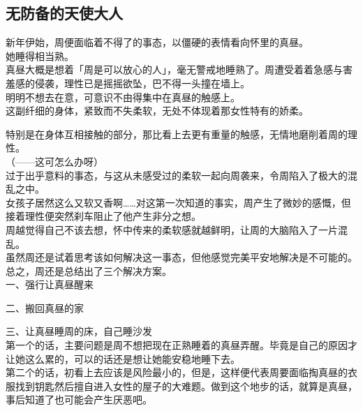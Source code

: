 \subsection{无防备的天使大人}

新年伊始，周便面临着不得了的事态，以僵硬的表情看向怀里的真昼。\\

她睡得相当熟。\\

真昼大概是想着「周是可以放心的人」，毫无警戒地睡熟了。周遭受着着急感与害羞感的侵袭，理性已是摇摇欲坠，巴不得一头撞在墙上。\\

明明不想去在意，可意识不由得集中在真昼的触感上。\\

这副纤细的身体，紧致而不失柔软，无处不体现着那女性特有的娇柔。

特别是在身体互相接触的部分，那比看上去更有重量的触感，无情地磨削着周的理性。\\

（——这可怎么办呀）\\

过于出乎意料的事态，与这从未感受过的柔软一起向周袭来，令周陷入了极大的混乱之中。\\

女孩子居然这么又软又香啊……对这第一次知道的事实，周产生了微妙的感慨，但接着理性便突然刹车阻止了他产生非分之想。\\

周越觉得自己不该去想，怀中传来的柔软感就越鲜明，让周的大脑陷入了一片混乱。\\

虽然周还是试着思考该如何解决这一事态，但他感觉完美平安地解决是不可能的。\\

总之，周还是总结出了三个解决方案。\\

一、强行让真昼醒来

二、搬回真昼的家

三、让真昼睡周的床，自己睡沙发\\

第一个的话，主要问题是周不想把现在正熟睡着的真昼弄醒。毕竟是自己的原因才让她这么累的，可以的话还是想让她能安稳地睡下去。\\

第二个的话，初看上去应该是风险最小的，但是，这样便代表周要面临掏真昼的衣服找到钥匙然后擅自进入女性的屋子的大难题。做到这个地步的话，就算是真昼，事后知道了也可能会产生厌恶吧。\\

